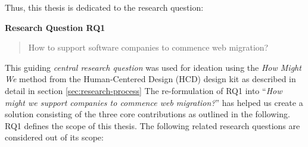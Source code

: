 Thus, this thesis is dedicated to the research question:

\textbf{Research Question RQ1}

\begin{quote}
How to support software companies to commence web migration?
\end{quote}

This guiding \emph{central research question} \autocite{Creswell2014ResearchDesign} was used for ideation using the \emph{How Might We} method from the Human-Centered Design (HCD) design kit \autocite{HCD2015} as described in detail in section \cref{sec:research-process}
The re-formulation of RQ1 into ``\emph{How might we support companies to commence web migration?}'' has helped us create a solution consisting of the three core contributions as outlined in the following.
RQ1 defines the scope of this thesis.
The following related research questions are considered out of its scope:

